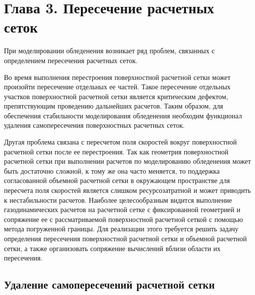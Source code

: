 \newpage
\section*{Глава 3. Пересечение расчетных сеток}                      %
\addtocounter{section}{1}                                            %
\setcounter{subsection}{0}
\setcounter{figure}{0}
\setcounter{equation}{0}
\setcounter{table}{0}
\setcounter{theorem}{0}
\setcounter{lemma}{0}
\setcounter{definition}{0}


При моделировании обледенения возникает ряд проблем, связанных с определением пересечения расчетных сеток.

Во время выполнения перестроения поверхностной расчетной сетки может произойти пересечение отдельных ее частей.
Такое пересечение отдельных участков поверхностной расчетной сетки является критическим дефектом, препятствующим проведению дальнейших расчетов.
Таким образом, для обеспечения стабильности моделирования обледенения необходим функционал удаления самопересечения поверхностных расчетных сеток.

Другая проблема связана с пересчетом поля скоростей вокруг поверхностной расчетной сетки после ее перестроения.
Так как геометрия поверхностной расчетной сетки при выполнении расчетов по моделированию обледенения может быть достаточно сложной, к тому же она часто меняется, то поддержка согласованной объемной расчетной сетки в окружающем пространстве для пересчета поля скоростей является слишком ресурсозатратной и может приводить к нестабильности расчетов.
Наиболее целесообразным видится выполнение газодинамических расчетов на расчетной сетке с фиксированной геометрией и сопряжение ее с рассматриваемой поверхностной расчетной сеткой с помощью метода погруженной границы.
Для реализации этого требуется решить задачу определения пересечения поверхностной расчетной сетки и объемной расчетной сетки, а также организовать сопряжение вычислений вблизи области их пересечения.

\subsection{Удаление самопересечений расчетной сетки}

